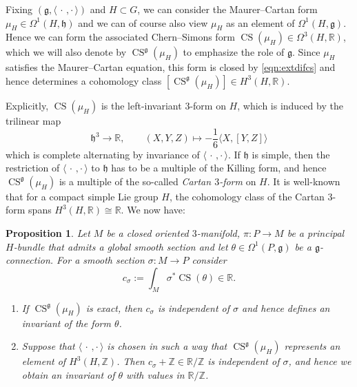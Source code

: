 \documentclass[british,11pt,a4paper]{amsart}
\numberwithin{equation}{section}
\renewcommand\frak{\mathfrak}
\renewcommand\Bbb{\mathbb}
\newcommand{\si}{\sigma}
\newcommand{\deq}{:=}
\newcommand{\Om}{\Omega}
\newcommand{\B}[2]{\langle#1,#2\rangle}
\newcommand{\CS}{\operatorname{CS}}
\newcommand{\Z}{\mathbb{Z}}
\newcommand*{\R}{\mathbb{R}}
\newcommand{\col}{:}
\newcounter{theorem}
\numberwithin{theorem}{section}
\newtheorem{prop}[theorem]{Proposition}
\theoremstyle{definition}
\theoremstyle{remark}
\begin{document}
Fixing $(\frak{g},\B{\,\cdot\,}{\cdot\,})$ and $H\subset G$, we can consider the Maurer--Cartan
form $\mu_H\in\Om^1(H,\frak{h})$ and we can of course also view $\mu_H$ as an element
of $\Om^1(H,\frak{g})$. Hence we can form the associated Chern--Simons form
$\CS(\mu_H)\in\Om^3(H,\R)$, which we will also denote by
$\CS^{\frak{g}}(\mu_H)$ to emphasize the role of $\frak{g}$. Since $\mu_H$ satisfies
the Maurer--Cartan equation, this form is closed by \eqref{eqn:extdifcs} and hence
determines a cohomology class $[\CS^{\frak{g}}(\mu_H)]\in H^3(H,\R)$.

Explicitly, $\CS(\mu_H)$ is the left-invariant $3$-form on $H$, which is induced by
the trilinear map
\[
\frak{h}^3\to\R, \qquad (X,Y,Z)\mapsto
-\frac16\B{X}{[Y,Z]}
\]
which is complete alternating by invariance of $\B{\,\cdot\,}{\cdot\,}$. If $\frak{h}$ is simple,
then the restriction of $\B{\,\cdot\,}{\cdot\,}$ to $\frak{h}$ has to be a multiple
of the Killing form, and hence $\CS^{\frak{g}}(\mu_H)$ is a multiple of the so-called
\textit{Cartan $3$-form} on $H$.
It is well-known that for a compact simple Lie group $H$, the cohomology class of the Cartan $3$-form  spans
  $H^3(H,\R)\cong\R$. We now have:
  \begin{prop}\label{prop:pullbacks}
  Let $M$ be a closed oriented $3$-manifold, $\pi \col P \to M$ be a principal
  $H$-bundle that admits a global smooth section and let $\theta\in\Om^1(P,\frak{g})$
  be a $\mathfrak{g}$-connection. For a smooth section $\si\col M\to P$
  consider 
  \[
  c_\si\deq\int_M \si^*\CS(\theta)\in\R.
  \]
  \begin{enumerate}
    \item[(i)] If $\CS^{\frak{g}}(\mu_H)$ is exact, then $c_\si$ is independent of $\si$
    and hence defines an invariant of the form $\theta$.

    \item[(ii)] Suppose that $\B{\,\cdot\,}{\cdot\,}$ is chosen in such a way that $\CS^{\frak
    g}(\mu_H)$ represents an element of $H^3(H,\Z)$. Then $c_\si+\Z\in\R/\Bbb
    Z$ is independent of $\si$, and hence we obtain an invariant of $\theta$ with
    values in $\R/\Z$.
  \end{enumerate}
  \end{prop}
\end{document}
